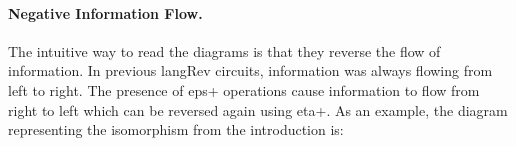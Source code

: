 \documentclass[preprint]{sigplanconf}
\begin{document}
\paragraph*{Negative Information Flow.} 
The intuitive way to read the diagrams is that they reverse the flow of
information. In previous {{langRev}} circuits, information was always flowing
from left to right. The presence of {{eps+}} operations cause information to
flow from right to left which can be reversed again using {{eta+}}.  As an
example, the diagram representing the isomorphism from the introduction is:
\begin{center}
\end{center}


\end{document}
